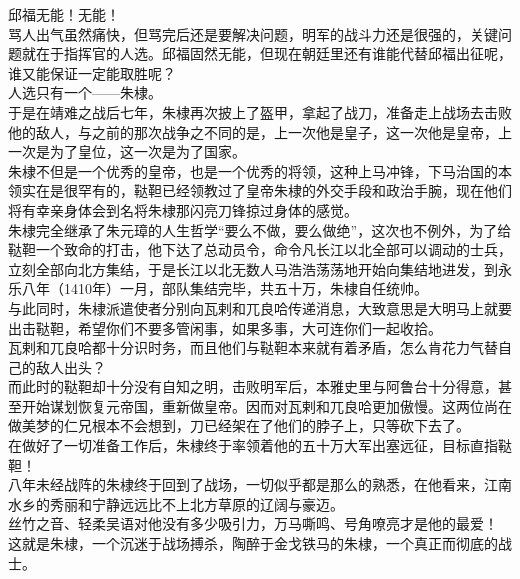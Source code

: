 \begin{multicols}{\theparacolNo}
邱福无能！无能！\\

骂人出气虽然痛快，但骂完后还是要解决问题，明军的战斗力还是很强的，关键问题就在于指挥官的人选。邱福固然无能，但现在朝廷里还有谁能代替邱福出征呢，谁又能保证一定能取胜呢？\\

人选只有一个——朱棣。\\

于是在靖难之战后七年，朱棣再次披上了盔甲，拿起了战刀，准备走上战场去击败他的敌人，与之前的那次战争之不同的是，上一次他是皇子，这一次他是皇帝，上一次是为了皇位，这一次是为了国家。\\

朱棣不但是一个优秀的皇帝，也是一个优秀的将领，这种上马冲锋，下马治国的本领实在是很罕有的，鞑靼已经领教过了皇帝朱棣的外交手段和政治手腕，现在他们将有幸亲身体会到名将朱棣那闪亮刀锋掠过身体的感觉。\\

朱棣完全继承了朱元璋的人生哲学“要么不做，要么做绝”，这次也不例外，为了给鞑靼一个致命的打击，他下达了总动员令，命令凡长江以北全部可以调动的士兵，立刻全部向北方集结，于是长江以北无数人马浩浩荡荡地开始向集结地进发，到永乐八年（1410年）一月，部队集结完毕，共五十万，朱棣自任统帅。\\

与此同时，朱棣派遣使者分别向瓦剌和兀良哈传递消息，大致意思是大明马上就要出击鞑靼，希望你们不要多管闲事，如果多事，大可连你们一起收拾。\\

瓦剌和兀良哈都十分识时务，而且他们与鞑靼本来就有着矛盾，怎么肯花力气替自己的敌人出头？\\

而此时的鞑靼却十分没有自知之明，击败明军后，本雅史里与阿鲁台十分得意，甚至开始谋划恢复元帝国，重新做皇帝。因而对瓦剌和兀良哈更加傲慢。这两位尚在做美梦的仁兄根本不会想到，刀已经架在了他们的脖子上，只等砍下去了。\\

在做好了一切准备工作后，朱棣终于率领着他的五十万大军出塞远征，目标直指鞑靼！\\

八年未经战阵的朱棣终于回到了战场，一切似乎都是那么的熟悉，在他看来，江南水乡的秀丽和宁静远远比不上北方草原的辽阔与豪迈。\\

丝竹之音、轻柔吴语对他没有多少吸引力，万马嘶鸣、号角嘹亮才是他的最爱！\\

这就是朱棣，一个沉迷于战场搏杀，陶醉于金戈铁马的朱棣，一个真正而彻底的战士。\\


\end{multicols}
